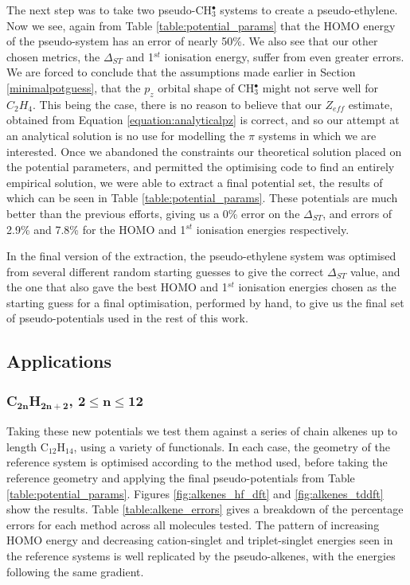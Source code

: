 \documentclass[12pt]{article}
\begin{document}
The next step was to take two pseudo-CH\(^{\bullet}_{3}\) systems to create a pseudo-ethylene. Now we see, again from Table \ref{table:potential_params} that the HOMO energy of the pseudo-system has an error of nearly 50\%. We also see that our other chosen metrics, the $\Delta_{ST}$ and 1$^{st}$ ionisation energy, suffer from even greater errors. We are forced to conclude that the assumptions made earlier in Section \ref{minimalpotguess}, that the $p_{z}$ orbital shape of CH\(^{\bullet}_{3}\) might not serve well for $C_{2}H_{4}$. This being the case, there is no reason to believe that our $Z_{eff}$ estimate, obtained from Equation \ref{equation:analyticalpz} is correct, and so our attempt at an analytical solution is no use for modelling the $\pi$ systems in which we are interested. Once we abandoned the constraints our theoretical solution placed on the potential parameters, and permitted the optimising code to find an entirely empirical solution, we were able to extract a final potential set, the results of which can be seen in Table \ref{table:potential_params}. These potentials are much better than the previous efforts, giving us a 0\% error on the $\Delta_{ST}$, and errors of 2.9\% and 7.8\% for the HOMO and 1$^{st}$ ionisation energies respectively.

In the final version of the extraction, the pseudo-ethylene system was optimised from several different random starting guesses to give the correct $\Delta_{ST}$ value, and the one that also gave the best HOMO and 1$^{st}$ ionisation energies chosen as the starting guess for a final optimisation, performed by hand, to give us the final set of pseudo-potentials used in the rest of this work.

\subsection*{\sffamily \large Applications}

\subsubsection*{\sffamily \large C\(\mathbf{_{2n}}\)H\(\mathbf{_{2n+2}}\), \(\mathbf{2 \leq n \leq 12}\)}

Taking these new potentials we test them against a series of chain alkenes up to length C\(_{12}\)H\(_{14}\), using a variety of functionals. In each case, the geometry of the reference system is optimised according to the method used, 
before taking the reference geometry and applying the final pseudo-potentials from Table \ref{table:potential_params}. 
Figures \ref{fig:alkenes_hf_dft} and \ref{fig:alkenes_tddft} show the results. Table \ref{table:alkene_errors} gives a breakdown of the percentage errors for each method across all molecules tested. The pattern of increasing HOMO energy and decreasing cation-singlet and triplet-singlet energies seen in the reference systems is well replicated by the pseudo-alkenes, with the energies following the same gradient.
\end{document}
